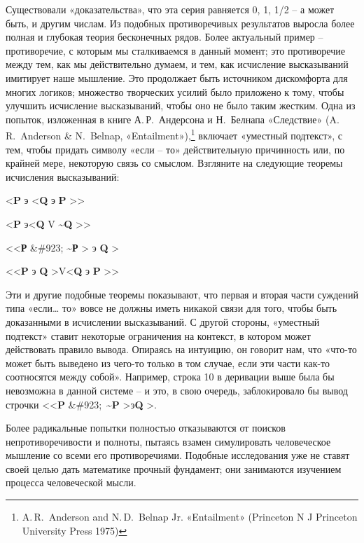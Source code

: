 \documentclass[../main.tex]{subfiles}
\begin{document}
Существовали «доказательства», что эта серия равняется 0, 1, 1/2 \--- а может быть, и другим числам. Из подобных противоречивых результатов выросла более полная и глубокая теория бесконечных рядов. Более актуальный пример \--- противоречие, с которым мы сталкиваемся в данный момент; это противоречие между тем, как мы действительно думаем, и тем, как исчисление высказываний имитирует наше мышление. Это продолжает быть источником дискомфорта для многих логиков; множество творческих усилий было приложено к тому, чтобы улучшить исчисление высказываний, чтобы оно не было таким жестким. Одна из попыток, изложенная в книге А.\,Р.~Андерсона и Н.~Белнапа «Следствие» (A.\,R.~Anderson \& N.~Belnap, «Entailment»),\footnote{A.\,R.~Anderson and N.\,D.~Belnap Jr. «Entailment» (Princeton N J Princeton University Press 1975)} включает «уместный подтекст», с тем, чтобы придать символу «если \--- то» действительную причинность или, по крайней мере, некоторую связь со смыслом. Взгляните на следующие теоремы исчисления высказываний:

\textless{}\textbf{P} э \textless{}\textbf{Q} э \textbf{P} \textgreater\textgreater{}

\textless{}\textbf{P} э\textless{}\textbf{Q} V \textbf{\textasciitilde Q} \textgreater\textgreater{}

\textless\textless{}\textbf{Р} \&\#923; \textbf{\textasciitilde Р} \textgreater{} э \textbf{Q} \textgreater{}

\textless\textless{}\textbf{P} э \textbf{Q} \textgreater V\textless{}\textbf{Q} э \textbf{P} \textgreater\textgreater{}

Эти и другие подобные теоремы показывают, что первая и вторая части суждений типа «если\ldots{} то» вовсе не должны иметь никакой связи для того, чтобы быть доказанными в исчислении высказываний. С другой стороны, «уместный подтекст» ставит некоторые ограничения на контекст, в котором может действовать правило вывода. Опираясь на интуицию, он говорит нам, что «что-то может быть выведено из чего-то только в том случае, если эти части как-то соотносятся между собой». Например, строка 10 в деривации выше была бы невозможна в данной системе \--- и это, в свою очередь, заблокировало бы вывод строчки \textless\textless{}\textbf{P} \&\#923;~\textbf{\textasciitilde P} \textgreater э\textbf{Q} \textgreater.

Более радикальные попытки полностью отказываются от поисков непротиворечивости и полноты, пытаясь взамен симулировать человеческое мышление со всеми его противоречиями. Подобные исследования уже не ставят своей целью дать математике прочный фундамент; они занимаются изучением процесса человеческой мысли.
\end{document}
